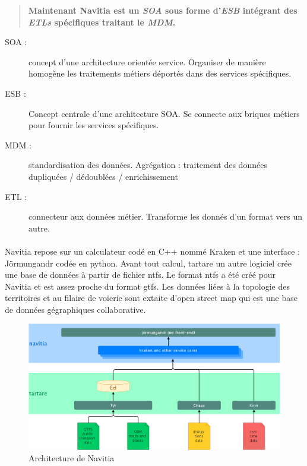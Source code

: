 \documentclass[a4paper]{report}
\begin{document}
\begin{quote}
	\textbf{Maintenant Navitia est un \emph{SOA} sous forme d'\emph{ESB} intégrant des \emph{ETLs} spécifiques traitant le \emph{MDM}.}
\end{quote}
\begin{description}
	\item[SOA :] concept d'une architecture orientée service. Organiser de manière homogène les traitements métiers déportés dans des services spécifiques.
	\item[ESB :] Concept centrale d'une architecture SOA. Se connecte aux briques métiers pour fournir les services spécifiques.
	\item[MDM :] standardisation des données. Agrégation : traitement des données dupliquées / dédoublées / enrichissement
	\item[ETL :] connecteur aux données métier. Transforme les donnés d'un format vers un autre.
\end{description}

\paragraph{}Navitia repose sur un calculateur codé en C++ nommé Kraken et une interface : Jörmungandr codée en python. Avant tout calcul, tartare un autre logiciel crée une base de données à partir de fichier ntfs. Le format ntfs a été créé pour Navitia et est assez proche du format gtfs. Les données liées à la topologie des territoires et au filaire de voierie sont extaite d'open street map qui est une base de données gégraphiques collaborative.

\begin{figure}[H]
	\begin{center}
		\includegraphics[width=400pt]{image/architecture_navitia}
		\caption{Architecture de Navitia}
		\label{Architecture de Navitia}
	\end{center}
\end{figure}
\end{document}
